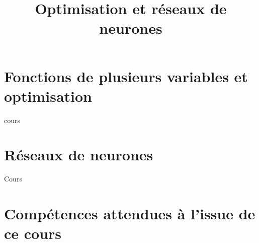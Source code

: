 \documentclass[fleqn,a4paper,11pt]{book}
\title{Optimisation et réseaux de neurones}
\begin{document}
\maketitle
\tableofcontents
\newpage

\newcommand{\myscale}{1}
\newcommand{\couleurnb}[2]{#2}
\newcommand{\mybox}[1]{\begin{center}\tikz{\node[block]{#1};}\end{center}}
\newcommand{\mystar}{\star}

\chapter{Fonctions de plusieurs variables et optimisation}

{cours}

\newpage

\chapter{Réseaux de neurones}
{Cours}

\newpage



\appendix
\chapter{Compétences attendues à l'issue de ce cours}

\end{document}
